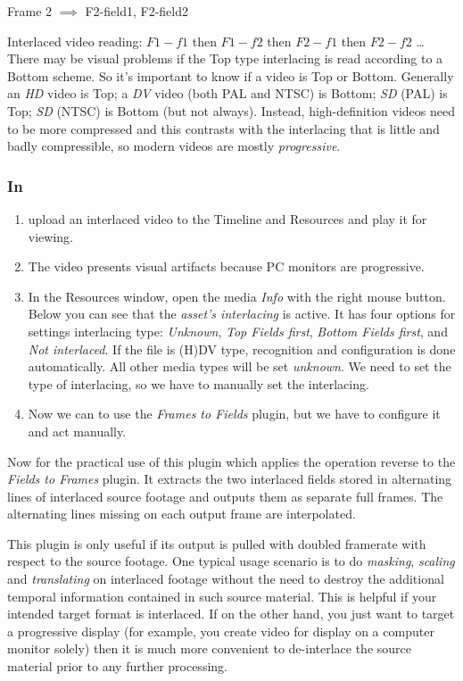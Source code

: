 Frame 2 $\implies$ F2-field1, F2-field2

Interlaced video reading: $F1-f1$ then $F1-f2$ then $F2-f1$ then $F2-f2$ \dots
There may be visual problems if the Top type interlacing is read according to a Bottom scheme. So it's important to know if a video is Top or Bottom. Generally an \textit{HD} video is Top; a \textit{DV} video (both PAL and NTSC) is Bottom; \textit{SD} (PAL) is Top; \textit{SD} (NTSC) is Bottom (but not always). Instead, high-definition videos need to be more compressed and this contrasts with the interlacing that is little and badly compressible, so modern videos are mostly \textit{progressive}.

\subsubsection*{In \CGG{}}
\label{ssub:in_cin_gg}

\begin{enumerate}
    \item upload an interlaced video to the Timeline and Resources and play it for viewing.
    \item The video presents visual artifacts because PC monitors are progressive.
    \item In the Resources window, open the media \textit{Info} with the right mouse button. Below you can see that the \textit{asset's interlacing} is active. It has four options for settings interlacing type: \textit{Unknown}, \textit{Top Fields first}, \textit{Bottom Fields first}, and \textit{Not interlaced}. If the file is (H)DV type, recognition and configuration is done automatically. All other media types will be set \textit{unknown}. We need to set the type of interlacing, so we have to manually set the interlacing.
    \item Now we can to use the \textit{Frames to Fields} plugin, but we have to configure it and act manually.
\end{enumerate}

Now for the practical use of this plugin which applies the operation reverse to the \textit{Fields to Frames} plugin. It extracts the two interlaced fields stored in alternating lines of interlaced source footage and outputs them as separate full frames. The alternating lines missing on each output frame are interpolated.

This plugin is only useful if its output is pulled with doubled framerate with respect to the source footage. One typical usage scenario is to do \textit{masking}, \textit{scaling} and \textit{translating} on interlaced footage without the need to destroy the additional temporal information contained in such source material. This is helpful if your intended target format is interlaced. If on the other hand, you just want to target a progressive display (for example, you create video for display on a computer monitor solely) then it is much more convenient to de-interlace the source material prior to any further processing.

